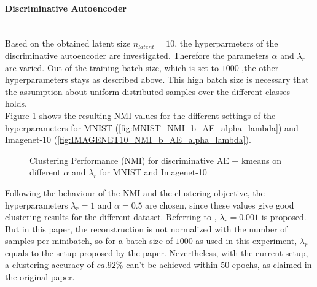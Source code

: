 \documentclass[12pt,DIV14,BCOR12mm,a4paper,footexclude,headinclude,halfparskip-,twoside,openright,openany,cleardoubleempty,idxtotoc,bibtotoc]{scrreprt} %
\numberwithin{equation}{chapter}
\begin{document}
	\paragraph{Discriminative Autoencoder}\hfill \\
	Based on the obtained latent size $n_{latent} = 10$, the hyperparmeters of the discriminative autoencoder are investigated. Therefore the parameters $\alpha$ and $\lambda_r$ are varied. Out of the training batch size, which is set to $1000$ ,the other hyperparameters stays as described above. This high batch size is necessary that the assumption about uniform distributed samples over the different classes holds.
	\\Figure \ref{fig:ClusterPerformance_b_AE_Hyperparameters} shows the resulting NMI values for the different settings of the hyperparameters for MNIST (\ref{fig:MNIST_NMI_b_AE_alpha_lambda}) and Imagenet-10 (\ref{fig:IMAGENET10_NMI_b_AE_alpha_lambda}).
	\begin{figure}[htb!]
		\centering
		\qquad
		\caption{Clustering Performance (NMI) for discriminative AE + kmeans on different $\alpha$ and $\lambda_r$ for MNIST and Imagenet-10}
		\label{fig:ClusterPerformance_b_AE_Hyperparameters}
	\end{figure}
	Following the behaviour of the NMI and the clustering objective, the hyperparameters $\lambda_r = 1$ and $\alpha=0.5$ are chosen, since these values give good clustering results for the different dataset. Referring to \cite{DiscriminativeClustering}, $\lambda_r = 0.001$ is proposed. But in this paper, the reconstruction is not normalized with the number of samples per minibatch, so for a batch size of $1000$ as used in this experiment, $\lambda_r$ equals to the setup proposed by the paper. Nevertheless, with the current setup, a clustering accuracy of $ca. 92\%$ can't be achieved within 50 epochs, as claimed in the original paper.
\end{document}
